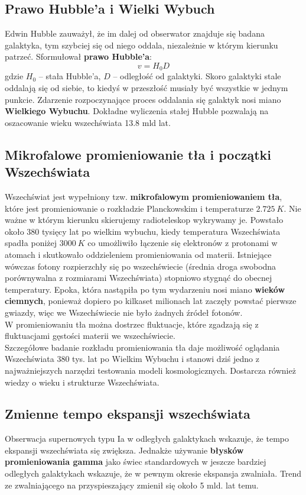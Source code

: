 \documentclass[../index.tex]{subfiles}
\begin{document}
        \subsection{Prawo Hubble'a i Wielki Wybuch}
            Edwin Hubble zauważył, że im dalej od obserwator znajduje się badana galaktyka, tym szybciej się od niego oddala, niezależnie w którym kierunku patrzeć. Sformułował \textbf{prawo Hubble'a}:
            \begin{equation}
                v = H_0 D
            \end{equation}
            gdzie \(H_0\) – stała Hubble'a, \(D\) – odległość od galaktyki. Skoro galaktyki stale oddalają się od siebie, to kiedyś w przeszłość musiały być wszystkie w jednym punkcie. Zdarzenie rozpoczynające proces oddalania się galaktyk nosi miano \textbf{Wielkiego Wybuchu}. Dokładne wyliczenia stałej Hubble pozwalają na oszacowanie wieku wszechświata 13.8 mld lat.
        \subsection{Mikrofalowe promieniowanie tła i początki Wszechświata}
            Wszechświat jest wypełniony tzw. \textbf{mikrofalowym promieniowaniem tła}, które jest promieniowanie o rozkładzie Planckowskim i temperaturze \(2.725\: K\). Nie ważne w którym kierunku skierujemy radioteleskop wykrywamy je. Powstało około 380 tysięcy lat po wielkim wybuchu, kiedy temperatura Wszechświata spadła poniżej \(3000\:K\) co umożliwiło łączenie się elektronów z protonami w atomach i skutkowało oddzieleniem promieniowania od materii. Istniejące wówczas fotony rozpierzchły się po wszechświecie (średnia droga swobodna porównywalna z rozmiarami Wszechświata) stopniowo stygnąć do obecnej temperatury. Epoka, która nastąpiła po tym wydarzeniu nosi miano \textbf{wieków ciemnych}, ponieważ dopiero po kilkaset milionach lat zaczęły powstać pierwsze gwiazdy, więc we Wszechświecie nie było żadnych źródeł fotonów.\\
            W promieniowaniu tła można dostrzec fluktuacje, które zgadzają się z fluktuacjami gęstości materii we wszechświecie.\\
            Szczegółowe badanie rozkładu promieniowania tła daje możliwość oglądania Wszechświata 380 tys. lat po Wielkim Wybuchu i stanowi dziś jedno z najważniejszych narzędzi testowania modeli kosmologicznych. Dostarcza również wiedzy o wieku i strukturze Wszechświata.
        \subsection{Zmienne tempo ekspansji wszechświata}
            Obserwacja supernowych typu Ia w odległych galaktykach wskazuje, że tempo ekspansji wszechświata się zwiększa. Jednakże używanie \textbf{błysków promieniowania gamma} jako świec standardowych w jeszcze bardziej odległych galaktykach wskazuje, że w pewnym okresie ekspansja zwalniała. Trend ze zwalniającego na przyspieszający zmienił się około 5 mld. lat temu.
\end{document}
